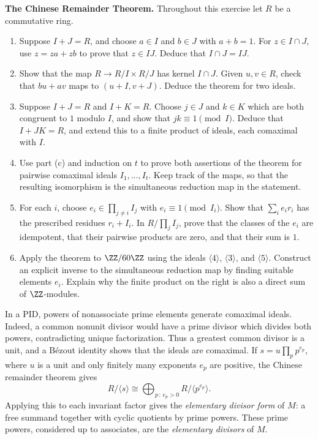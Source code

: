 \documentclass[12pt,reqno]{amsart}
\begin{document}
\begin{problems}
\item\label{s:crt} \textbf{The Chinese Remainder Theorem.} Throughout this exercise let $R$ be a commutative ring.
\begin{enumerate}
\item Suppose $I+J=R$, and choose $a\in I$ and $b\in J$ with $a+b=1$. For $z\in I\cap J$, use $z=za+zb$ to prove that $z\in IJ$. Deduce that $I\cap J=IJ$.
\item Show that the map $R\to R/I\times R/J$ has kernel $I\cap J$. Given $u,v\in R$, check that $bu+av$ maps to $(u+I,v+J)$. Deduce the theorem for two ideals.
\item Suppose $I+J=R$ and $I+K=R$. Choose $j\in J$ and $k\in K$ which are both congruent to $1$ modulo $I$, and show that $jk\equiv1\pmod I$. Deduce that $I+JK=R$, and extend this to a finite product of ideals, each comaximal with $I$.
\item Use part (c) and induction on $t$ to prove both assertions of the theorem for pairwise comaximal ideals $I_1,\ldots,I_t$. Keep track of the maps, so that the resulting isomorphism is the simultaneous reduction map in the statement.
\item For each $i$, choose $e_i\in\prod_{j\ne i}I_j$ with $e_i\equiv1\pmod{I_i}$. Show that $\sum_ie_ir_i$ has the prescribed residues $r_i+I_i$. In $R/\prod_jI_j$, prove that the classes of the $e_i$ are idempotent, that their pairwise products are zero, and that their sum is $1$.
\item Apply the theorem to $\ZZ/60\ZZ$ using the ideals $\langle4\rangle$, $\langle3\rangle$, and $\langle5\rangle$. Construct an explicit inverse to the simultaneous reduction map by finding suitable elements $e_i$. Explain why the finite product on the right is also a direct sum of $\ZZ$-modules.
\end{enumerate}
\end{problems}

\hrulefill

In a PID, powers of nonassociate prime elements generate comaximal ideals. Indeed, a common nonunit divisor would have a prime divisor which divides both powers, contradicting unique factorization. Thus a greatest common divisor is a unit, and a B\'ezout identity shows that the ideals are comaximal. If $s=u\prod_pp^{e_p}$, where $u$ is a unit and only finitely many exponents $e_p$ are positive, the Chinese remainder theorem gives
\[
R/\langle s\rangle\cong\bigoplus_{p\,:\,e_p>0}R/\langle p^{e_p}\rangle.
\]
Applying this to each invariant factor gives the \emph{elementary divisor form} of $M$: a free summand together with cyclic quotients by prime powers. These prime powers, considered up to associates, are the \emph{elementary divisors} of $M$.
\end{document}
